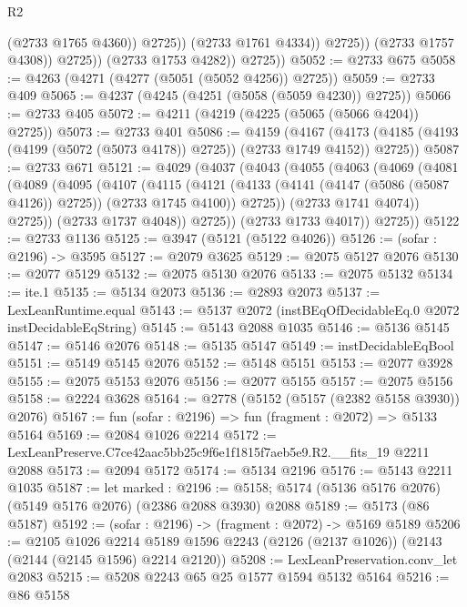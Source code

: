 \begin{lexlean}{R2}
\begin{coremodule}
                            (@2733 @1765 @4360))
                          @2725))
                      (@2733 @1761 @4334))
                    @2725))
                (@2733 @1757 @4308))
              @2725))
          (@2733 @1753 @4282))
        @2725))
@5052 := @2733 @675
@5058 := @4263 (@4271 (@4277 (@5051 (@5052 @4256)) @2725))
@5059 := @2733 @409
@5065 := @4237 (@4245 (@4251 (@5058 (@5059 @4230)) @2725))
@5066 := @2733 @405
@5072 := @4211 (@4219 (@4225 (@5065 (@5066 @4204)) @2725))
@5073 := @2733 @401
@5086 := @4159
    (@4167 (@4173 (@4185 (@4193 (@4199 (@5072 (@5073 @4178)) @2725)) (@2733 @1749 @4152)) @2725))
@5087 := @2733 @671
@5121 := @4029
    (@4037
      (@4043
        (@4055
          (@4063
            (@4069
              (@4081
                (@4089
                  (@4095
                    (@4107
                      (@4115
                        (@4121
                          (@4133 (@4141 (@4147 (@5086 (@5087 @4126)) @2725)) (@2733 @1745 @4100))
                          @2725))
                      (@2733 @1741 @4074))
                    @2725))
                (@2733 @1737 @4048))
              @2725))
          (@2733 @1733 @4017))
        @2725))
@5122 := @2733 @1136
@5125 := @3947 (@5121 (@5122 @4026))
@5126 := (sofar : @2196) -> @3595
@5127 := @2079 @3625
@5129 := @2075 @5127 @2076
@5130 := @2077 @5129
@5132 := @2075 @5130 @2076
@5133 := @2075 @5132
@5134 := ite.{1}
@5135 := @5134 @2073
@5136 := @2893 @2073
@5137 := LexLeanRuntime.equal
@5143 := @5137 @2072 (instBEqOfDecidableEq.{0} @2072 instDecidableEqString)
@5145 := @5143 @2088 @1035
@5146 := @5136 @5145
@5147 := @5146 @2076
@5148 := @5135 @5147
@5149 := instDecidableEqBool
@5151 := @5149 @5145 @2076
@5152 := @5148 @5151
@5153 := @2077 @3928
@5155 := @2075 @5153 @2076
@5156 := @2077 @5155
@5157 := @2075 @5156
@5158 := @2224 @3628
@5164 := @2778 (@5152 (@5157 (@2382 @5158 @3930)) @2076)
@5167 := fun (sofar : @2196) => fun (fragment : @2072) => @5133 @5164
@5169 := @2084 @1026 @2214
@5172 := LexLeanPreserve.C7ce42aac5bb25c9f6e1f1815f7aeb5e9.R2.__fits_19 @2211 @2088
@5173 := @2094 @5172
@5174 := @5134 @2196
@5176 := @5143 @2211 @1035
@5187 := let marked : @2196 := @5158;
  @5174 (@5136 @5176 @2076) (@5149 @5176 @2076) (@2386 @2088 @3930) @2088
@5189 := @5173 (@86 @5187)
@5192 := (sofar : @2196) -> (fragment : @2072) -> @5169 @5189
@5206 := @2105
    @1026
    @2214
    @5189
    @1596
    @2243
    (@2126 (@2137 @1026))
    (@2143 (@2144 (@2145 @1596) @2214 @2120))
@5208 := LexLeanPreservation.conv_let @2083
@5215 := @5208 @2243 @65 @25 @1577 @1594 @5132 @5164
@5216 := @86 @5158

\end{coremodule}
\end{lexlean}
